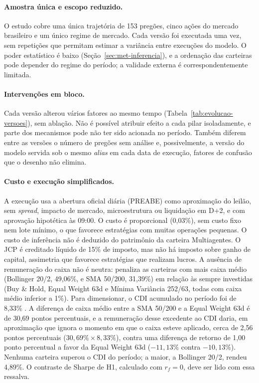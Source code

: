 \paragraph*{Amostra única e escopo reduzido.} O estudo cobre uma única trajetória de 153 pregões, cinco ações do mercado brasileiro e um único regime de mercado. Cada versão foi executada uma vez, sem repetições que permitam estimar a variância entre execuções do modelo. O poder estatístico é baixo (Seção~\ref{sec:met-inferencia}), e a ordenação das carteiras pode depender do regime do período; a validade externa é correspondentemente limitada.

\paragraph*{Intervenções em bloco.} Cada versão alterou vários fatores ao mesmo tempo (Tabela~\ref{tab:evolucao-versoes}), sem ablação. Não é possível atribuir efeito a cada pilar isoladamente, e parte dos mecanismos pode não ter sido acionada no período. Também diferem entre as versões o número de pregões sem análise e, possivelmente, a versão do modelo servida sob o mesmo \textit{alias} em cada data de execução, fatores de confusão que o desenho não elimina.

\paragraph*{Custo e execução simplificados.} A execução usa a abertura oficial diária (PREABE) como aproximação do leilão, sem \textit{spread}, impacto de mercado, microestrutura ou liquidação em D+2, e com aprovação hipotética às 09:00. O custo é proporcional (0,03\%), sem custo fixo nem lote mínimo, o que favorece estratégias com muitas operações pequenas. O custo de inferência não é deduzido do patrimônio da carteira Multiagentes. O JCP é creditado líquido de 15\% de imposto, mas não há imposto sobre ganho de capital, assimetria que favorece estratégias que realizam lucros. A ausência de remuneração do caixa não é neutra: penaliza as carteiras com mais caixa médio (Bollinger 20/2, 49,06\%, e SMA 50/200, 31,39\%) em relação às sempre investidas (Buy \& Hold, Equal Weight 63d e Mínima Variância 252/63, todas com caixa médio inferior a 1\%). Para dimensionar, o CDI acumulado no período foi de 8,33\% \citep{BCBCDI2026}. A diferença de caixa médio entre a SMA 50/200 e a Equal Weight 63d é de 30,69 pontos percentuais, e a remuneração desse excedente ao CDI daria, em aproximação que ignora o momento em que o caixa esteve aplicado, cerca de 2,56 pontos percentuais ($30{,}69\% \times 8{,}33\%$), contra uma diferença de retorno de 1,00 ponto percentual a favor da Equal Weight 63d ($-11{,}13\%$ contra $-10{,}13\%$). Nenhuma carteira superou o CDI do período; a maior, a Bollinger 20/2, rendeu 4,89\%. O contraste de Sharpe de H1, calculado com $r_f = 0$, deve ser lido com essa ressalva.

